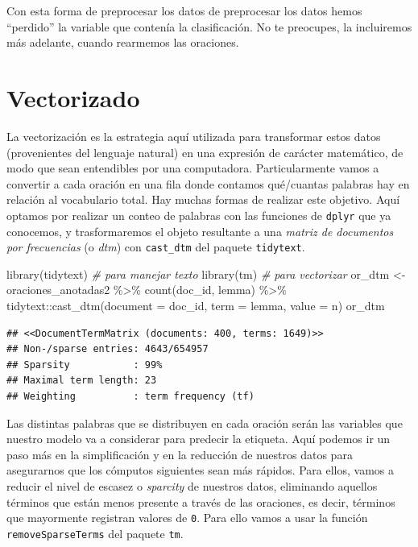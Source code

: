 \documentclass[
]{book}
\newenvironment{Shaded}{\begin{snugshade}}{\end{snugshade}}
\newcommand{\AttributeTok}[1]{\textcolor[rgb]{0.77,0.63,0.00}{#1}}
\newcommand{\CommentTok}[1]{\textcolor[rgb]{0.56,0.35,0.01}{\textit{#1}}}
\newcommand{\FunctionTok}[1]{\textcolor[rgb]{0.00,0.00,0.00}{#1}}
\newcommand{\NormalTok}[1]{#1}
\newcommand{\OtherTok}[1]{\textcolor[rgb]{0.56,0.35,0.01}{#1}}
\newcommand{\SpecialCharTok}[1]{\textcolor[rgb]{0.00,0.00,0.00}{#1}}
\begin{document}
Con esta forma de preprocesar los datos de preprocesar los datos hemos ``perdido'' la variable que contenía la clasificación. No te preocupes, la incluiremos más adelante, cuando rearmemos las oraciones.

\hypertarget{vectorizado}{%
\section{Vectorizado}\label{vectorizado}}

La vectorización es la estrategia aquí utilizada para transformar estos datos (provenientes del lenguaje natural) en una expresión de carácter matemático, de modo que sean entendibles por una computadora. Particularmente vamos a convertir a cada oración en una fila donde contamos qué/cuantas palabras hay en relación al vocabulario total. Hay muchas formas de realizar este objetivo. Aquí optamos por realizar un conteo de palabras con las funciones de \texttt{dplyr} que ya conocemos, y trasformaremos el objeto resultante a una \emph{matriz de documentos por frecuencias} (o \emph{dtm}) con \texttt{cast\_dtm} del paquete \texttt{tidytext}.

\begin{Shaded}
\begin{Highlighting}[]
\FunctionTok{library}\NormalTok{(tidytext) }\CommentTok{\# para manejar texto}
\FunctionTok{library}\NormalTok{(tm) }\CommentTok{\# para vectorizar}
\NormalTok{or\_dtm }\OtherTok{\textless{}{-}}\NormalTok{ oraciones\_anotadas2 }\SpecialCharTok{\%\textgreater{}\%}
        \FunctionTok{count}\NormalTok{(doc\_id, lemma) }\SpecialCharTok{\%\textgreater{}\%}
\NormalTok{        tidytext}\SpecialCharTok{::}\FunctionTok{cast\_dtm}\NormalTok{(}\AttributeTok{document =}\NormalTok{ doc\_id, }\AttributeTok{term =}\NormalTok{ lemma, }\AttributeTok{value =}\NormalTok{ n)}
\NormalTok{or\_dtm}
\end{Highlighting}
\end{Shaded}

\begin{verbatim}
## <<DocumentTermMatrix (documents: 400, terms: 1649)>>
## Non-/sparse entries: 4643/654957
## Sparsity           : 99%
## Maximal term length: 23
## Weighting          : term frequency (tf)
\end{verbatim}

Las distintas palabras que se distribuyen en cada oración serán las variables que nuestro modelo va a considerar para predecir la etiqueta. Aquí podemos ir un paso más en la simplificación y en la reducción de nuestros datos para asegurarnos que los cómputos siguientes sean más rápidos. Para ellos, vamos a reducir el nivel de escasez o \emph{sparcity} de nuestros datos, eliminando aquellos términos que están menos presente a través de las oraciones, es decir, términos que mayormente registran valores de \texttt{0}. Para ello vamos a usar la función \texttt{removeSparseTerms} del paquete \texttt{tm}.
\end{document}
